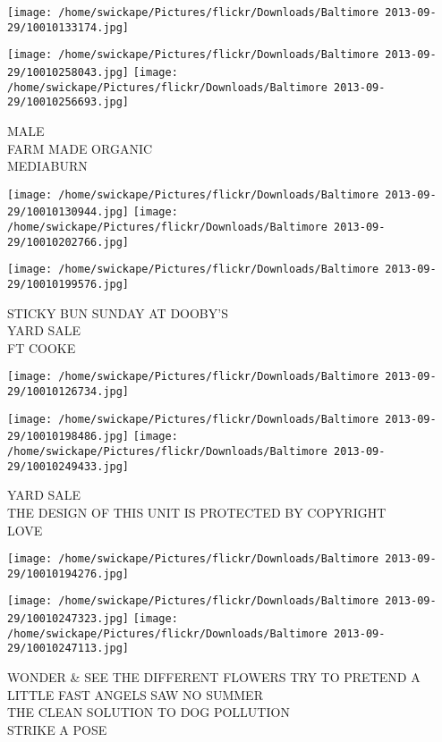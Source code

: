 \documentclass[10pt,letterpaper]{article}
\begin{document}
\texttt{[image: /home/swickape/Pictures/flickr/Downloads/Baltimore 2013-09-29/10010133174.jpg]}

\vspace{0.25in}
\texttt{[image: /home/swickape/Pictures/flickr/Downloads/Baltimore 2013-09-29/10010258043.jpg]}
\texttt{[image: /home/swickape/Pictures/flickr/Downloads/Baltimore 2013-09-29/10010256693.jpg]}

MALE\\
FARM MADE ORGANIC\\
MEDIABURN\\
\pagebreak

\texttt{[image: /home/swickape/Pictures/flickr/Downloads/Baltimore 2013-09-29/10010130944.jpg]}
\texttt{[image: /home/swickape/Pictures/flickr/Downloads/Baltimore 2013-09-29/10010202766.jpg]}

\texttt{[image: /home/swickape/Pictures/flickr/Downloads/Baltimore 2013-09-29/10010199576.jpg]}

STICKY BUN SUNDAY AT DOOBY'S\\
YARD SALE\\
FT COOKE\\
\pagebreak

\texttt{[image: /home/swickape/Pictures/flickr/Downloads/Baltimore 2013-09-29/10010126734.jpg]}

\vspace{0.25in}
\texttt{[image: /home/swickape/Pictures/flickr/Downloads/Baltimore 2013-09-29/10010198486.jpg]}
\texttt{[image: /home/swickape/Pictures/flickr/Downloads/Baltimore 2013-09-29/10010249433.jpg]}

YARD SALE\\
THE DESIGN OF THIS UNIT IS PROTECTED BY COPYRIGHT\\
LOVE\\
\pagebreak

\texttt{[image: /home/swickape/Pictures/flickr/Downloads/Baltimore 2013-09-29/10010194276.jpg]}

\vspace{0.25in}
\texttt{[image: /home/swickape/Pictures/flickr/Downloads/Baltimore 2013-09-29/10010247323.jpg]}
\texttt{[image: /home/swickape/Pictures/flickr/Downloads/Baltimore 2013-09-29/10010247113.jpg]}

WONDER \& SEE THE DIFFERENT FLOWERS TRY TO PRETEND A LITTLE FAST ANGELS SAW NO SUMMER\\
THE CLEAN SOLUTION TO DOG POLLUTION\\
STRIKE A POSE\\
\pagebreak
\end{document}

